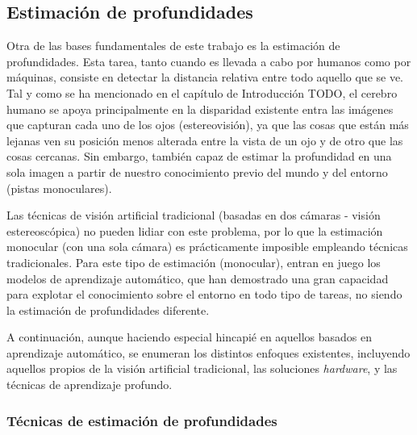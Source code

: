 \subsection{Estimación de profundidades}
Otra de las bases fundamentales de este trabajo es la estimación de profundidades. Esta tarea, tanto cuando es llevada a cabo por humanos como por máquinas, consiste en detectar la distancia relativa entre todo aquello que se ve. Tal y como se ha mencionado en el capítulo de Introducción TODO, el cerebro humano se apoya principalmente en la disparidad existente entra las imágenes que capturan cada uno de los ojos (estereovisión), ya que las cosas que están más lejanas ven su posición menos alterada entre la vista de un ojo y de otro que las cosas cercanas. Sin embargo, también capaz de estimar la profundidad en una sola imagen a partir de nuestro conocimiento previo del mundo y del entorno (pistas monoculares). 

Las técnicas de visión artificial tradicional (basadas en dos cámaras - visión estereoscópica) no pueden lidiar con este problema, por lo que la estimación monocular (con una sola cámara) es prácticamente imposible empleando técnicas tradicionales. Para este tipo de estimación (monocular), entran en juego los modelos de aprendizaje automático, que han demostrado una gran capacidad para explotar el conocimiento sobre el entorno en todo tipo de tareas, no siendo la estimación de profundidades diferente. 

A continuación, aunque haciendo especial hincapié en aquellos basados en aprendizaje automático, se enumeran los distintos enfoques existentes, incluyendo aquellos propios de la visión artificial tradicional, las soluciones \textit{hardware}, y las técnicas de aprendizaje profundo.

\subsubsection{Técnicas de estimación de profundidades} \label{estimacion-profundidades-sota}

